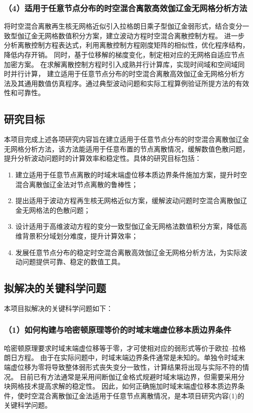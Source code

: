 \subsubsection*{\bfseries （4）适用于任意节点分布的时空混合离散高效伽辽金无网格分析方法}
将时空混合离散再生核无网格近似引入拉格朗日乘子型伽辽金弱形式，结合变分一致型伽辽金无网格数值积分方案，建立波动方程时空混合离散控制方程。
进一步分析离散控制方程表达式，利用离散控制方程刚度矩阵的相似性，优化程序结构，降低内存开销。
同时，基于位移解的梯度变化，制定相对应的无网格自适应节点加密方案。
在求解离散控制方程时引入成熟并行计算库，实现时间域和空间域同时并行计算，
建立适用于任意节点分布的时空混合离散高效伽辽金无网格分析方法及其通用数值仿真程序。通过典型波动问题和实际工程算例验证所提方法的有效性和可靠性。

\subsection{研究目标}
本项目完成上述各项研究内容旨在建立适用于任意节点分布的时空混合离散伽辽金无网格分析方法，该方法能适用于任意布置的节点离散情况，缓解数值色散问题，
提升分析波动问题时的计算效率和稳定性。具体的研究目标包括：
\begin{enumerate}[label={\rmfamily (\theenumi)},left=24pt]
    \item 建立适用于任意节点离散的时域末端虚位移本质边界条件施加方案，提升时空混合离散伽辽金法对节点离散的鲁棒性；
    \item 提出适用于波动方程再生核无网格近似方案，缓解波动问题时空混合离散伽辽金无网格法的色散问题；
    \item 设计适用于高维波动方程的变分一致型伽辽金无网格法数值积分方案，降低高维背景积分域划分难度，提升计算效率；
    \item 发展任意节点分布的稳定时空混合离散高效伽辽金无网格分析方法，为实际波动问题提供可靠、稳定的数值工具。
\end{enumerate}

\subsection{拟解决的关键科学问题}

本项目拟解决的关键科学问题如下：

\subsubsection*{\bfseries （1）如何构建与哈密顿原理等价的时域末端虚位移本质边界条件}
哈密顿原理要求时域末端虚位移等于零，才可使相对应的弱形式等价于欧拉--拉格朗日方程。
由于在实际问题中，时域末端边界条件通常是未知的。单独令时域末端虚位移为零将导致整体弱形式丧失变分一致性，计算结果将出现与实际不符的情况。
目前已有方法通常是采用间断伽辽金格式规避时域末端边界，但需要采用分块网格技术提高求解的稳定性。
因此，如何正确施加时域末端虚位移本质边界条件，使时空混合离散伽辽金法适用于任意节点离散情况，是本项目研究内容(1)的关键科学问题。


